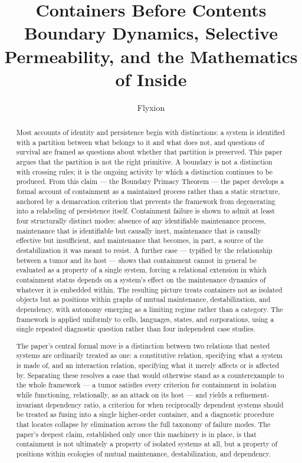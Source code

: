 \documentclass[11pt]{article}
\title{\textbf{Containers Before Contents}\\[0.3em]
\large Boundary Dynamics, Selective Permeability, and the Mathematics of Inside}
\author{Flyxion}
\date{}
\theoremstyle{plain}
\begin{document}
\maketitle

\begin{abstract}
\noindent
Most accounts of identity and persistence begin with distinctions: a system is identified with a partition between what belongs to it and what does not, and questions of survival are framed as questions about whether that partition is preserved. This paper argues that the partition is not the right primitive. A boundary is not a distinction with crossing rules; it is the ongoing activity by which a distinction continues to be produced. From this claim --- the Boundary Primacy Theorem --- the paper develops a formal account of containment as a maintained process rather than a static structure, anchored by a demarcation criterion that prevents the framework from degenerating into a relabeling of persistence itself. Containment failure is shown to admit at least four structurally distinct modes: absence of any identifiable maintenance process, maintenance that is identifiable but causally inert, maintenance that is causally effective but insufficient, and maintenance that becomes, in part, a source of the destabilization it was meant to resist. A further case --- typified by the relationship between a tumor and its host --- shows that containment cannot in general be evaluated as a property of a single system, forcing a relational extension in which containment status depends on a system's effect on the maintenance dynamics of whatever it is embedded within. The resulting picture treats containers not as isolated objects but as positions within graphs of mutual maintenance, destabilization, and dependency, with autonomy emerging as a limiting regime rather than a category. The framework is applied uniformly to cells, languages, states, and corporations, using a single repeated diagnostic question rather than four independent case studies.

\medskip
\noindent
The paper's central formal move is a distinction between two relations that nested systems are ordinarily treated as one: a constitutive relation, specifying what a system is made of, and an interaction relation, specifying what it merely affects or is affected by. Separating these resolves a case that would otherwise stand as a counterexample to the whole framework --- a tumor satisfies every criterion for containment in isolation while functioning, relationally, as an attack on its host --- and yields a refinement-invariant dependency ratio, a criterion for when reciprocally dependent systems should be treated as fusing into a single higher-order container, and a diagnostic procedure that locates collapse by elimination across the full taxonomy of failure modes. The paper's deepest claim, established only once this machinery is in place, is that containment is not ultimately a property of isolated systems at all, but a property of positions within ecologies of mutual maintenance, destabilization, and dependency.

\end{abstract}
\end{document}
